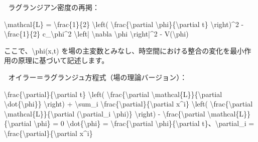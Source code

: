 \documentclass{article}
\begin{document}
🧩 ラグランジアン密度の再掲：

\textbackslash{}mathcal\{L\} = \textbackslash{}frac\{1\}\{2\} \textbackslash{}left( \textbackslash{}frac\{\textbackslash{}partial \textbackslash{}phi\}\{\textbackslash{}partial t\} \textbackslash{}right)\textasciicircum{}2 - \textbackslash{}frac\{1\}\{2\} c\_\textbackslash{}phi\textasciicircum{}2 \textbackslash{}left| \textbackslash{}nabla \textbackslash{}phi \textbackslash{}right|\textasciicircum{}2 - V(\textbackslash{}phi)

ここで、\textbackslash{}phi(x,t) を場の主変数とみなし、時空間における整合の変化を最小作用の原理に基づいて記述します。

🧠 オイラー＝ラグランジュ方程式（場の理論バージョン）：

\textbackslash{}frac\{\textbackslash{}partial\}\{\textbackslash{}partial t\} \textbackslash{}left( \textbackslash{}frac\{\textbackslash{}partial \textbackslash{}mathcal\{L\}\}\{\textbackslash{}partial \textbackslash{}dot\{\textbackslash{}phi\}\} \textbackslash{}right) + \textbackslash{}sum\_i \textbackslash{}frac\{\textbackslash{}partial\}\{\textbackslash{}partial x\textasciicircum{}i\} \textbackslash{}left( \textbackslash{}frac\{\textbackslash{}partial \textbackslash{}mathcal\{L\}\}\{\textbackslash{}partial (\textbackslash{}partial\_i \textbackslash{}phi)\} \textbackslash{}right) - \textbackslash{}frac\{\textbackslash{}partial \textbackslash{}mathcal\{L\}\}\{\textbackslash{}partial \textbackslash{}phi\} = 0
\textbackslash{}dot\{\textbackslash{}phi\} = \textbackslash{}frac\{\textbackslash{}partial \textbackslash{}phi\}\{\textbackslash{}partial t\}、\textbackslash{}partial\_i = \textbackslash{}frac\{\textbackslash{}partial\}\{\textbackslash{}partial x\textasciicircum{}i\}
\end{document}
